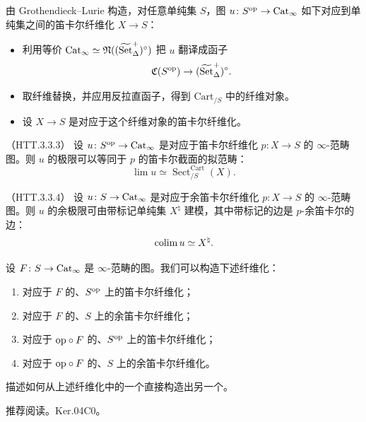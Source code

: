 \nitem\label{L20-5.7} 由 Grothendieck–Lurie 构造，对任意单纯集 $S$，图 $u\colon S^{\mathrm{op}}\to\operatorname{Cat}_\infty$ 如下对应到单纯集之间的笛卡尔纤维化 $X\to S$：
\begin{itemize}[leftmargin=2.2em,itemsep=0.1em]
\item 利用等价 $\operatorname{Cat}_\infty\simeq\mathfrak{N}((\widetilde{\operatorname{Set}}^+_\Delta)^\circ)$ 把 $u$ 翻译成函子
\[
\mathfrak{C}(S^{\mathrm{op}})\to(\widetilde{\operatorname{Set}}^+_\Delta)^\circ.
\]
\item 取纤维替换，并应用反拉直函子，得到 $\mathrm{Cart}_{/S}$ 中的纤维对象。
\item 设 $X\to S$ 是对应于这个纤维对象的笛卡尔纤维化。
\end{itemize}

\begin{proposition}\label{L20-5.8}（HTT.3.3.3）
设 $u\colon S^{\mathrm{op}}\to\operatorname{Cat}_\infty$ 是对应于笛卡尔纤维化 $p\colon X\to S$ 的 $\infty$-范畴图。则 $u$ 的极限可以等同于 $p$ 的笛卡尔截面的拟范畴：
\[
\lim u\simeq\operatorname{Sect}^{\mathrm{Cart}}_{/S}(X).
\]
\end{proposition}

\begin{proposition}\label{L20-5.9}（HTT.3.3.4）
设 $u\colon S\to\operatorname{Cat}_\infty$ 是对应于余笛卡尔纤维化 $p\colon X\to S$ 的 $\infty$-范畴图。则 $u$ 的余极限可由带标记单纯集 $X^{\natural}$ 建模，其中带标记的边是 $p$-余笛卡尔的边：
\[
\operatorname{colim} u\simeq X^{\natural}.
\]
\end{proposition}


\nitem\label{L20-A.1} 设 $F\colon S\to\operatorname{Cat}_\infty$ 是 $\infty$-范畴的图。我们可以构造下述纤维化：
\begin{enumerate}[label=(\roman*),leftmargin=2.4em,itemsep=0.1em]
\item 对应于 $F$ 的、$S^{\mathrm{op}}$ 上的笛卡尔纤维化；
\item 对应于 $F$ 的、$S$ 上的余笛卡尔纤维化；
\item 对应于 $\mathrm{op}\circ F$ 的、$S^{\mathrm{op}}$ 上的笛卡尔纤维化；
\item 对应于 $\mathrm{op}\circ F$ 的、$S$ 上的余笛卡尔纤维化。
\end{enumerate}

\begin{exercise}\label{L20-A.2}
描述如何从上述纤维化中的一个直接构造出另一个。
\end{exercise}

\nitem\label{L20-A.3} 推荐阅读。Ker.04C0。

